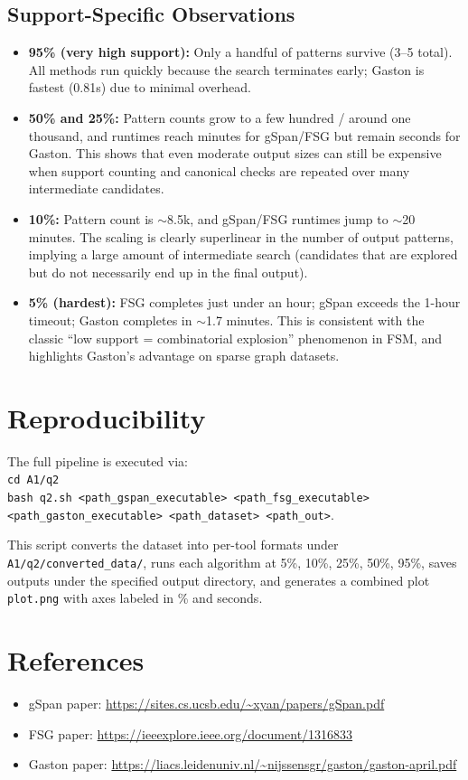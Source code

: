 \documentclass[11pt]{article}
\begin{document}
\subsection{Support-Specific Observations}

\begin{itemize}
	\item \textbf{95\% (very high support):} Only a handful of patterns survive (3--5 total). All methods run quickly because the search terminates early; Gaston is fastest (0.81s) due to minimal overhead.
	\item \textbf{50\% and 25\%:} Pattern counts grow to a few hundred / around one thousand, and runtimes reach minutes for gSpan/FSG but remain seconds for Gaston. This shows that even moderate output sizes can still be expensive when support counting and canonical checks are repeated over many intermediate candidates.
	\item \textbf{10\%:} Pattern count is $\sim$8.5k, and gSpan/FSG runtimes jump to $\sim$20 minutes. The scaling is clearly superlinear in the number of output patterns, implying a large amount of intermediate search (candidates that are explored but do not necessarily end up in the final output).
	\item \textbf{5\% (hardest):} FSG completes just under an hour; gSpan exceeds the 1-hour timeout; Gaston completes in $\sim$1.7 minutes. This is consistent with the classic ``low support = combinatorial explosion'' phenomenon in FSM, and highlights Gaston’s advantage on sparse graph datasets.
\end{itemize}

\section{Reproducibility}

The full pipeline is executed via:\\
\texttt{cd A1/q2}\\
\texttt{bash q2.sh <path\_gspan\_executable> <path\_fsg\_executable> <path\_gaston\_executable> <path\_dataset> <path\_out>}.

This script converts the dataset into per-tool formats under \texttt{A1/q2/converted\_data/}, runs each algorithm at 5\%, 10\%, 25\%, 50\%, 95\%, saves outputs under the specified output directory, and generates a combined plot \texttt{plot.png} with axes labeled in \% and seconds.

\section{References}

\begin{itemize}
	\item gSpan paper: \url{https://sites.cs.ucsb.edu/~xyan/papers/gSpan.pdf}
	\item FSG paper: \url{https://ieeexplore.ieee.org/document/1316833}
	\item Gaston paper: \url{https://liacs.leidenuniv.nl/~nijssensgr/gaston/gaston-april.pdf}
\end{itemize}
\end{document}
